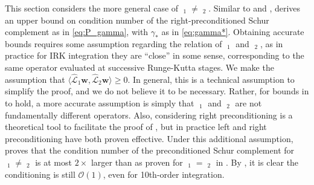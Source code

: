 \documentclass[review]{siamart}
\DeclareMathOperator{\cL}{\widehat{\mathcal{L}}}
\begin{document}
This section considers the more general case of $\cL_1 \neq \cL_2$. Similar to
 and ,  derives an upper bound on condition number of the
right-preconditioned Schur complement as in \eqref{eq:P_gamma}, with $\gamma_*$
as in \eqref{eq:gamma*}. Obtaining accurate bounds requires some assumption
regarding the relation of $\cL_1$ and $\cL_2$, as in practice for IRK
integration they are ``close'' in some sense, corresponding to the same operator
evaluated at successive Runge-Kutta stages. We make the assumption that
$\langle\widehat{\mathcal{L}}_1\mathbf{w},
\widehat{\mathcal{L}}_2\mathbf{w}\rangle\geq 0$. In general, this is a technical
assumption to simplify the proof, and we do not believe it to be necessary.
Rather, for bounds in  to hold, a more accurate assumption is
simply that $\cL_1$ and $\cL_2$ are not fundamentally different operators.
Also, considering right preconditioning is a theoretical tool to facilitate
the proof of , but in practice left and right preconditioning
have both proven effective. Under this additional assumption, 
proves that the condition number of the preconditioned Schur complement for
$\cL_1 \neq \cL_2$ is at most $2\times$ larger than as proven for
$\cL_1 = \cL_2$ in . By , it is clear the
conditioning is still $\mathcal{O}(1)$, even for 10th-order integration.
\end{document}
